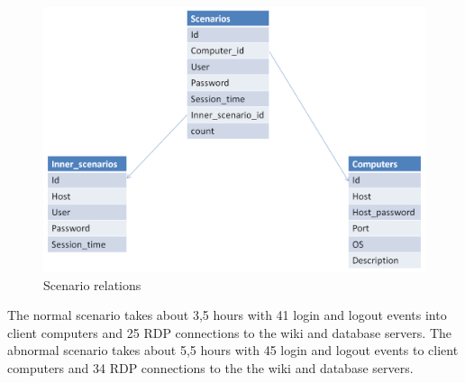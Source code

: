 \begin{figure}[ht!]
\centering
\includegraphics[width=\textwidth]{scenario_relations.png}
\caption{Scenario relations}
\label{overflow}
\end{figure}


The normal scenario takes about 3,5 hours with 41 login and logout events into client computers and 25 RDP connections to the wiki and database servers. The abnormal scenario takes about 5,5 hours with 45 login and logout events to client computers and 34 RDP connections to the the wiki and database servers.
 
% 